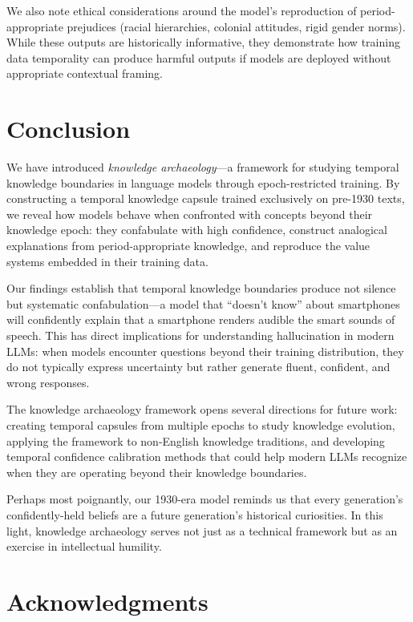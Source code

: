 \documentclass[11pt]{article}
\begin{document}
We also note ethical considerations around the model's reproduction of period-appropriate prejudices (racial hierarchies, colonial attitudes, rigid gender norms). While these outputs are historically informative, they demonstrate how training data temporality can produce harmful outputs if models are deployed without appropriate contextual framing.

\section{Conclusion}

We have introduced \textit{knowledge archaeology}---a framework for studying temporal knowledge boundaries in language models through epoch-restricted training. By constructing a temporal knowledge capsule trained exclusively on pre-1930 texts, we reveal how models behave when confronted with concepts beyond their knowledge epoch: they confabulate with high confidence, construct analogical explanations from period-appropriate knowledge, and reproduce the value systems embedded in their training data.

Our findings establish that temporal knowledge boundaries produce not silence but systematic confabulation---a model that ``doesn't know'' about smartphones will confidently explain that a smartphone renders audible the smart sounds of speech. This has direct implications for understanding hallucination in modern LLMs: when models encounter questions beyond their training distribution, they do not typically express uncertainty but rather generate fluent, confident, and wrong responses.

The knowledge archaeology framework opens several directions for future work: creating temporal capsules from multiple epochs to study knowledge evolution, applying the framework to non-English knowledge traditions, and developing temporal confidence calibration methods that could help modern LLMs recognize when they are operating beyond their knowledge boundaries.

Perhaps most poignantly, our 1930-era model reminds us that every generation's confidently-held beliefs are a future generation's historical curiosities. In this light, knowledge archaeology serves not just as a technical framework but as an exercise in intellectual humility.

\section*{Acknowledgments}
\end{document}
